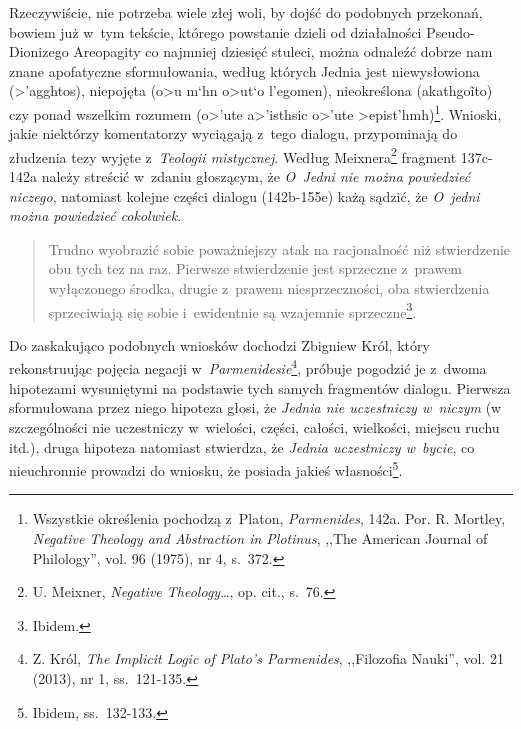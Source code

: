 Rzeczywiście, nie potrzeba wiele złej woli, by dojść do podobnych przekonań, bowiem już w~tym tekście, którego powstanie dzieli od działalności Pseudo-Dionizego Areopagity co najmniej dziesięć stuleci, można odnaleźć dobrze nam znane apofatyczne sformułowania, według których Jednia jest niewysłowiona (\textgreek{>'agghtos}), niepojęta (\textgreek{o>u m`hn o>ut`o l'egomen}), nieokreślona (\textgreek{akathgo\~ito}) czy ponad wszelkim rozumem (\textgreek{o>'ute a>'isthsic o>'ute >epist'hmh})\footnote{Wszystkie określenia pochodzą z~Platon, \textit{Parmenides}, 142a. Por. R. Mortley, \textit{Negative Theology and Abstraction in Plotinus}, ,,The American Journal of Philology'', vol. 96 (1975), nr 4, s.~372.}. Wnioski, jakie niektórzy komentatorzy wyciągają z~tego dialogu, przypominają do złudzenia tezy wyjęte z~\textit{Teologii mistycznej}. Według Meixnera\footnote{U. Meixner, \textit{Negative Theology}\ldots, op. cit., s.~76.} fragment 137c-142a należy streścić w~zdaniu głoszącym, że \textit{O~Jedni nie można powiedzieć niczego}, natomiast kolejne części dialogu (142b-155e) każą sądzić, że \textit{O~jedni można powiedzieć cokolwiek}.

\begin{quote}
Trudno wyobrazić sobie poważniejszy atak na racjonalność niż stwierdzenie obu tych tez na raz. Pierwsze stwierdzenie jest sprzeczne z~prawem wyłączonego środka, drugie z~prawem niesprzeczności, oba stwierdzenia sprzeciwiają się sobie i~ewidentnie są wzajemnie sprzeczne\footnote{Ibidem.}.
\end{quote}

Do zaskakująco podobnych wniosków dochodzi Zbigniew Król, który rekonstruując pojęcia negacji w~\textit{Parmenidesie}\footnote{Z. Król, \textit{The Implicit Logic of Plato's Parmenides}, ,,Filozofia Nauki'', vol. 21 (2013), nr 1, ss.~121-135.}, próbuje pogodzić je z~dwoma hipotezami wysuniętymi na podstawie tych samych fragmentów dialogu. Pierwsza sformułowana przez niego hipoteza głosi, że \textit{Jednia nie uczestniczy w~niczym} (w szczególności nie uczestniczy w~wielości, części, całości, wielkości, miejscu ruchu itd.), druga hipoteza natomiast stwierdza, że \textit{Jednia uczestniczy w~bycie}, co nieuchronnie prowadzi do wniosku, że posiada jakieś własności\footnote{Ibidem, ss.~132-133.}.

